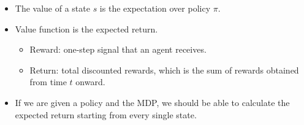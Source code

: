 \begin{itemize}
	\item The value of a state $s$ is the expectation over policy $\pi$.
	\item Value function is the expected return. 
		\begin{itemize}
			\item Reward: one-step signal that an agent receives.
			\item Return: total discounted rewards, which is the sum of rewards obtained from time $t$ onward.
		\end{itemize}
	\item If we are given a policy and the MDP, we should be able to calculate the expected return starting from every single state. 
\end{itemize}

